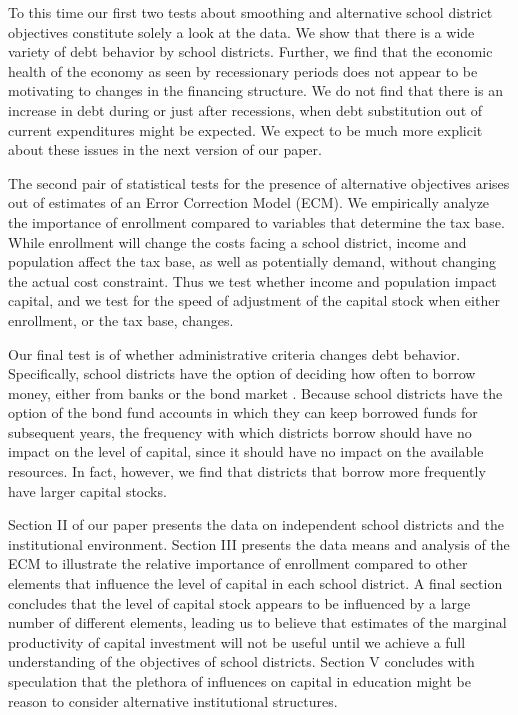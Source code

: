 To this time our first two tests about smoothing and alternative school district objectives constitute solely a look at the data. We show that there is a wide variety of debt behavior by school districts. Further, we find that the economic health of the economy as seen by recessionary periods does not appear to be motivating to changes in the financing structure. We do not find that there is an increase in debt during or just after recessions, when debt substitution out of current expenditures might be expected. We expect to be much more explicit about these issues in the next version of our paper.

The second pair of statistical tests for the presence of alternative objectives arises out of estimates of an Error Correction Model (ECM). We empirically analyze the importance of enrollment compared to variables that determine the tax base. While enrollment will change the costs facing a school district, income and population affect the tax base, as well as potentially demand, without changing the actual cost constraint. Thus we test whether income and population impact capital, and we test for the speed of adjustment of the capital stock when either enrollment, or the tax base, changes.

Our final test is of whether administrative criteria changes debt behavior. Specifically, school districts have the option of deciding how often to borrow money, either from banks or the bond market \autocite{ivanov_limits_2024}. Because school districts have the option of the bond fund accounts in which they can keep borrowed funds for subsequent years, the frequency with which districts borrow should have no impact on the level of capital, since it should have no impact on the available resources. In fact, however, we find that districts that borrow more frequently have larger capital stocks.

Section II of our paper presents the data on independent school districts and the institutional environment. Section III presents the data means and analysis of the ECM to illustrate the relative importance of enrollment compared to other elements that influence the level of capital in each school district. A final section concludes that the level of capital stock appears to be influenced by a large number of different elements, leading us to believe that estimates of the marginal productivity of capital investment will not be useful until we achieve a full understanding of the objectives of school districts. Section V concludes with speculation that the plethora of influences on capital in education might be reason to consider alternative institutional structures.

